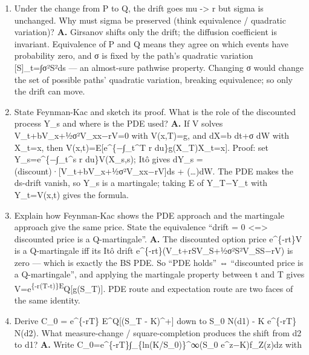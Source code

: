 \documentclass[
  11pt,
]{article}
\begin{document}
\begin{enumerate}
  dW\^{}Q, prove that the martingale property of e\^{}\{-rt\}S\_t forces
  mu' = r. \textbf{A.} Q is a measure equivalent to P under which the
  discounted asset e\^{}\{-rt\}S\_t is a martingale. By the product rule
  d(e\^{}\{-rt\}S\_t) = (μ'−r)e\^{}\{-rt\}S\_t dt + σe\^{}\{-rt\}S\_t
  dW\^{}Q. The stochastic integral is a martingale; the drift
  dt-integral is a martingale only if it vanishes, i.e.~μ'−r=0. Hence
  μ'=r and dS=rSdt+σS dW\^{}Q.
\item
  Under the change from P to Q, the drift goes mu -\textgreater{} r but
  sigma is unchanged. Why must sigma be preserved (think equivalence /
  quadratic variation)? \textbf{A.} Girsanov shifts only the drift; the
  diffusion coefficient is invariant. Equivalence of P and Q means they
  agree on which events have probability zero, and σ is fixed by the
  path's quadratic variation {[}S{]}\_t=∫σ²S²ds --- an almost-sure
  pathwise property. Changing σ would change the set of possible paths'
  quadratic variation, breaking equivalence; so only the drift can move.
\item
  State Feynman-Kac and sketch its proof. What is the role of the
  discounted process Y\_s and where is the PDE used? \textbf{A.} If V
  solves V\_t+bV\_x+½σ²V\_xx−rV=0 with V(x,T)=g, and dX=b dt+σ dW with
  X\_t=x, then V(x,t)=E{[}e\^{}\{−∫\_t\^{}T r
  du\}g(X\_T)\textbar X\_t=x{]}. Proof: set Y\_s=e\^{}\{−∫\_t\^{}s r
  du\}V(X\_s,s); Itô gives dY\_s =
  (discount)·{[}V\_t+bV\_x+½σ²V\_xx−rV{]}ds + (\ldots)dW. The PDE makes
  the ds-drift vanish, so Y\_s is a martingale; taking E of Y\_T−Y\_t
  with Y\_t=V(x,t) gives the formula.
\item
  Explain how Feynman-Kac shows the PDE approach and the martingale
  approach give the same price. State the equivalence ``drift = 0
  \textless=\textgreater{} discounted price is a Q-martingale''.
  \textbf{A.} The discounted option price e\^{}\{-rt\}V is a
  Q-martingale iff its Itô drift e\^{}\{-rt\}(V\_t+rSV\_S+½σ²S²V\_SS−rV)
  is zero --- which is exactly the BS PDE. So ``PDE holds'' ⇔
  ``discounted price is a Q-martingale'', and applying the martingale
  property between t and T gives
  V=e\textsuperscript{\{-r(T-t)\}E}Q{[}g(S\_T){]}. PDE route and
  expectation route are two faces of the same identity.
\item
  Derive C\_0 = e\^{}\{-rT\} E\^{}Q{[}(S\_T - K)\^{}+{]} down to S\_0
  N(d1) - K e\^{}\{-rT\} N(d2). What measure-change / square-completion
  produces the shift from d2 to d1? \textbf{A.} Write
  C\_0=e\^{}\{-rT\}∫\_\{ln(K/S\_0)\}\^{}∞(S\_0 e\^{}z−K)f\_Z(z)dz with

\end{enumerate}
\end{document}
